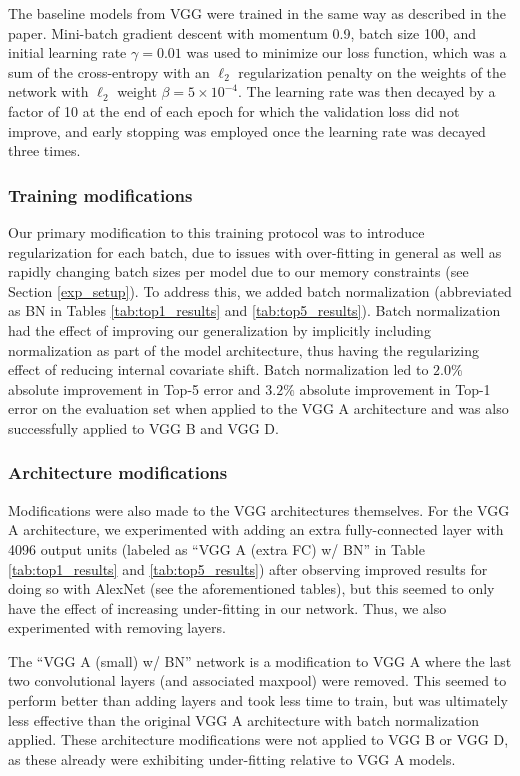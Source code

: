 \documentclass[10pt,twocolumn,letterpaper]{article}
\begin{document}
The baseline models from VGG were trained in the same way as
described in the paper. Mini-batch gradient descent with momentum
0.9, batch size 100, and initial learning rate $\gamma = 0.01$
was used to minimize our loss function, which was a sum of
the cross-entropy with an $\ell_2$ regularization penalty on
the weights of the network with $\ell_2$ weight
$\beta = 5 \times 10^{-4}$. The learning rate was then decayed
by a factor of 10 at the end of each epoch for which the
validation loss did not improve, and early stopping was employed
once the learning rate was decayed three times.

\subsubsection{Training modifications}
\label{vgg_train_mods}

Our primary modification to this training protocol was to 
introduce regularization for each batch, due to issues with
over-fitting in general as well as rapidly changing batch sizes
per model due to our memory constraints (see Section \ref{exp_setup}).
To address this, we added batch normalization \cite{BatchNorm} (abbreviated
as BN in Tables \ref{tab:top1_results} and \ref{tab:top5_results}).
Batch normalization had the effect of improving our generalization
by implicitly including normalization as part of the model
architecture, thus having the regularizing effect of reducing
internal covariate shift. Batch normalization led to $2.0\%$
absolute improvement in Top-5 error and $3.2\%$ absolute
improvement in Top-1 error on the evaluation set when applied
to the VGG A architecture and was also successfully applied to
VGG B and VGG D.

\subsubsection{Architecture modifications}
\label{vgg_arch_mods}

Modifications were also made to the VGG architectures themselves.
For the VGG A architecture, we experimented with adding an extra
fully-connected layer with 4096 output units (labeled as
``VGG A (extra FC) w/ BN'' in Table \ref{tab:top1_results} and
\ref{tab:top5_results}) after observing improved results for
doing so with AlexNet (see the aforementioned tables),
but this seemed to only have the effect of increasing under-fitting
in our network. Thus, we also experimented with removing layers.

The ``VGG A (small) w/ BN'' network is a modification to VGG A where
the last two convolutional layers (and associated maxpool) were
removed. This seemed to perform better than adding layers and took
less time to train, but was ultimately less effective than the
original VGG A architecture with batch normalization applied.
These architecture modifications were not applied to VGG B
or VGG D, as these already were exhibiting under-fitting relative
to VGG A models.
\end{document}
